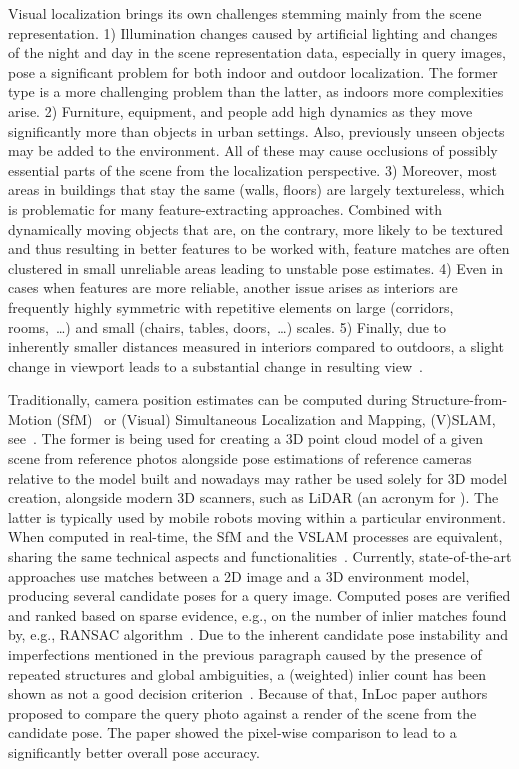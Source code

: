 Visual localization brings its own challenges stemming mainly from the scene representation.
1) Illumination changes caused by artificial lighting and changes of the night and day
in the scene representation data, especially in query images, pose a significant problem
for both indoor and outdoor localization. The former type is a more challenging problem than the latter,
as indoors more complexities arise. 2) Furniture, equipment, and people add high dynamics
as they move significantly more than objects in urban settings. Also, previously unseen
objects may be added to the environment. All of these may cause
occlusions of possibly essential parts of the scene from the localization perspective. 3) Moreover, most
areas in buildings that stay the same (walls, floors) are largely textureless, which is problematic for many
feature-extracting approaches. Combined with dynamically moving objects that are, on the contrary,
more likely to be textured and thus resulting in better features to be worked with, feature
matches are often clustered in small unreliable areas leading to unstable pose estimates. 4) Even
in cases when features are more reliable, another issue arises as interiors are frequently
highly symmetric with repetitive elements on large (corridors, rooms,~\ldots) and small
(chairs, tables, doors,~\ldots) scales. 5) Finally, due to inherently smaller distances measured
in interiors compared to outdoors, a slight change in viewport leads to a substantial change in resulting
view~\citep{InLoc}.

Traditionally, camera position estimates can be computed during Structure-from-Motion (SfM)~\citep{SfM} or
(Visual) Simultaneous Localization and Mapping, (V)SLAM, see~\citet{SLAM}. The former is being used for creating
a 3D point cloud model of a given scene from reference photos alongside pose estimations of reference
cameras relative to the model built and nowadays may rather be used solely for 3D model creation, alongside
modern 3D scanners, such as LiDAR (an acronym for ).
The latter is typically used by mobile robots moving within
a particular environment. When computed in real-time, the SfM and the VSLAM processes
are equivalent, sharing the same technical aspects and functionalities~\citep{VNAV}. Currently,
state-of-the-art approaches use matches between a 2D image and a 3D environment model,
producing several candidate poses for a query image. Computed poses are verified and ranked based
on sparse evidence, e.g., on the number
of inlier matches found by, e.g., RANSAC algorithm~\citep{RANSAC}. Due to the inherent candidate pose
instability and imperfections mentioned in the previous paragraph caused by the presence of repeated structures and
global ambiguities, a (weighted) inlier count has been shown as not a good
decision criterion~\citep{Burstiness}. Because of that,  InLoc paper authors~\citep{InLoc} proposed to compare
the query photo against a render of the scene from the candidate pose. The paper showed the pixel-wise comparison
to lead to a significantly better overall pose accuracy.

